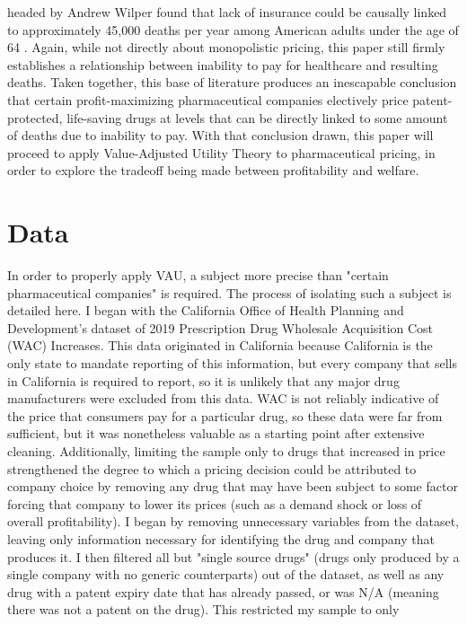 \documentclass[12pt,english]{article} \usepackage{mathptmx}
\begin{document}
headed by Andrew Wilper found that lack of insurance could be causally 
linked to approximately 45,000 deaths per year among American adults 
under the age of 64 \cite{wilper09}. Again, while not directly about 
monopolistic pricing, this paper still firmly establishes a relationship 
between inability to pay for healthcare and resulting deaths. Taken 
together, this base of literature produces an inescapable conclusion 
that certain profit-maximizing pharmaceutical companies electively price 
patent-protected, life-saving drugs at levels that can be directly 
linked to some amount of deaths due to inability to pay. With that 
conclusion drawn, this paper will proceed to apply Value-Adjusted 
Utility Theory to pharmaceutical pricing, in order to explore the 
tradeoff being made between profitability and welfare. 
\section{Data}\label{sec:data} In order to properly apply VAU, a subject 
more precise than "certain pharmaceutical companies" is required. The 
process of isolating such a subject is detailed here. I began with the 
California Office of Health Planning and Development's dataset of 2019 
Prescription Drug Wholesale Acquisition Cost (WAC) 
Increases\cite{wac20}. This data originated in California because 
California is the only state to mandate reporting of this information, 
but every company that sells in California is required to report, so it 
is unlikely that any major drug manufacturers were excluded from this 
data. WAC is not reliably indicative of the price that consumers pay for 
a particular drug, so these data were far from sufficient, but it was 
nonetheless valuable as a starting point after extensive cleaning. 
Additionally, limiting the sample only to drugs that increased in price 
strengthened the degree to which a pricing decision could be attributed 
to company choice by removing any drug that may have been subject to 
some factor forcing that company to lower its prices (such as a demand 
shock or loss of overall profitability). I began by removing unnecessary 
variables from the dataset, leaving only information necessary for 
identifying the drug and company that produces it. I then filtered all 
but "single source drugs" (drugs only produced by a single company with 
no generic counterparts) out of the dataset, as well as any drug with a 
patent expiry date that has already passed, or was N/A (meaning there 
was not a patent on the drug). This restricted my sample to only 
\end{document}
